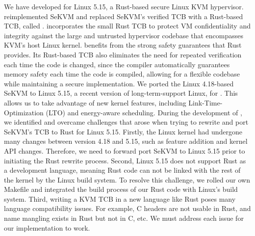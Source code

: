 We have developed \rustsec{} for Linux 5.15, a Rust-based secure Linux KVM hypervisor.
\rustsec{} reimplemented SeKVM \cite{sekvm} and replaced SeKVM's verified TCB
with a Rust-based TCB, called \rustcore{}.
\rustsec{} incorporates the small Rust TCB \rustcore{} to
protect VM confidentiality and integrity against the large and untrusted
hypervisor codebase that encompasses KVM’s host Linux kernel.
\rustsec{} benefits from the strong safety guarantees that Rust provides.
Its Rust-based TCB also eliminates the need for repeated verification each time the
code is changed, since the compiler automatically guarantees memory safety each
time the code is compiled, allowing for a flexible codebase while maintaining
a secure implementation.
We ported the Linux 4.18-based SeKVM to Linux 5.15, a recent version of
long-term-support Linux, for \rustsec{}. This allows us to take advantage of
new kernel features, including Link-Time-Optimization (LTO) and energy-aware
scheduling.
During the development of \rustsec{}, we identified and overcame challenges
that arose when trying to rewrite and port SeKVM's TCB to Rust for Linux 5.15.
Firstly, the Linux kernel had undergone many changes between version 4.18 and
5.15, such as feature addition and kernel API changes. Therefore, we need to
forward port SeKVM to Linux 5.15 prior to initiating the Rust rewrite process.
Second, Linux 5.15 does not support Rust as a development language, meaning
Rust code can not be linked with the rest of the kernel by the Linux build
system. To resolve this challenge, we rolled our own Makefile and integrated
the build process of our Rust code with Linux's build system.
Third, writing a KVM TCB in a new language like Rust poses many language
compatibility issues. For example, C headers are not usable in Rust, and name
mangling exists in Rust but not in C, etc. We must address each issue  for our
implementation to work.
